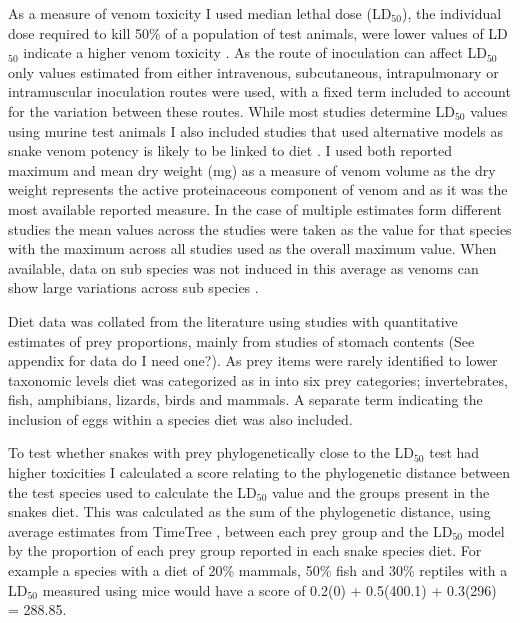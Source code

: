 As a measure of venom toxicity I used median lethal dose (LD$_{50}$), the individual dose required to kill 50\% of a population of test animals, were lower values of LD$_{50}$ indicate a higher venom toxicity \citep{chippaux1991snake}. As the route of inoculation can affect LD$_{50}$ \citep{chippaux1991snake} only values estimated from either intravenous, subcutaneous, intrapulmonary or intramuscular inoculation routes were used, with a fixed term included to account for the variation between these routes. While most studies determine LD$_{50}$ values using murine test animals I also included studies that used alternative models as snake venom potency is likely to be linked to diet \citep{barlow2009coevolution}. I used both reported maximum and mean dry weight (mg) as a measure of venom volume as the dry weight represents the active proteinaceous component of venom and as it was the most available reported measure. In the case of multiple estimates form different studies the mean values across the studies were taken as the value for that species with the maximum across all studies used as the overall maximum value. When available, data on sub species was not induced in this average as venoms can show large variations across sub species \citep{chippaux1991snake}.


Diet data was collated from the literature using studies with quantitative estimates of prey proportions, mainly from studies of stomach contents (See appendix for data do I need one?). As prey items were rarely identified to lower taxonomic levels diet was categorized as in \citep{allen2013evolution} into six prey categories; invertebrates, fish, amphibians, lizards, birds and mammals. A separate term indicating the inclusion of eggs within a species diet was also included.


To test whether snakes with prey phylogenetically close to the LD$_{50}$ test had higher toxicities I calculated a score relating to the phylogenetic distance between the test species used to calculate the LD$_{50}$ value and the groups present in the snakes diet. This was calculated as the sum of the phylogenetic distance, using average estimates from TimeTree \citep{hedges2006timetree}, between each prey group and the LD$_{50}$ model by the proportion of each prey group reported in each snake species diet. For example a species with a diet of 20\% mammals, 50\% fish and 30\% reptiles with a LD$_{50}$ measured using mice would have a score of 0.2\*(0) + 0.5\*(400.1) + 0.3\*(296) = 288.85.


